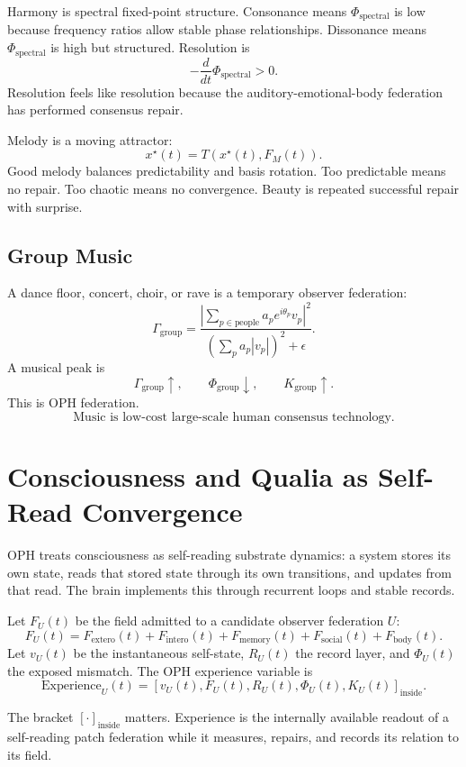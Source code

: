 \documentclass[11pt]{article}
\theoremstyle{remark}
\theoremstyle{plain}
\begin{document}
Harmony is spectral fixed-point structure. Consonance means \(\Phi_{\mathrm{spectral}}\) is low because frequency ratios allow stable phase relationships. Dissonance means \(\Phi_{\mathrm{spectral}}\) is high but structured. Resolution is
\[
-\frac{d}{dt}\Phi_{\mathrm{spectral}}>0.
\]
Resolution feels like resolution because the auditory-emotional-body federation has performed consensus repair.

Melody is a moving attractor:
\[
x^\star(t)=T(x^\star(t),F_M(t)).
\]
Good melody balances predictability and basis rotation. Too predictable means no repair. Too chaotic means no convergence. Beauty is repeated successful repair with surprise.

\subsection{Group Music}

A dance floor, concert, choir, or rave is a temporary observer federation:
\[
\Gamma_{\mathrm{group}}
=
\frac{
\left|
\sum_{p\in\mathrm{people}}
a_p e^{i\theta_p}v_p
\right|^2
}{
\left(\sum_p a_p|v_p|\right)^2+\epsilon
}.
\]
A musical peak is
\[
\Gamma_{\mathrm{group}}\uparrow,
\qquad
\Phi_{\mathrm{group}}\downarrow,
\qquad
K_{\mathrm{group}}\uparrow.
\]
This is OPH federation.
\[
\boxed{
\text{Music is low-cost large-scale human consensus technology.}
}
\]

\section{Consciousness and Qualia as Self-Read Convergence}

OPH treats consciousness as self-reading substrate dynamics: a system stores its own state, reads that stored state through its own transitions, and updates from that read. The brain implements this through recurrent loops and stable records.

Let \(F_U(t)\) be the field admitted to a candidate observer federation \(U\):
\[
F_U(t)
=
F_{\mathrm{extero}}(t)
+F_{\mathrm{intero}}(t)
+F_{\mathrm{memory}}(t)
+F_{\mathrm{social}}(t)
+F_{\mathrm{body}}(t).
\]
Let \(v_U(t)\) be the instantaneous self-state, \(R_U(t)\) the record layer, and \(\Phi_U(t)\) the exposed mismatch. The OPH experience variable is
\[
\boxed{
\mathrm{Experience}_U(t)
=
\left[
v_U(t),F_U(t),R_U(t),\Phi_U(t),K_U(t)
\right]_{\mathrm{inside}}.
}
\]

The bracket \([\cdot]_{\mathrm{inside}}\) matters. Experience is the internally available readout of a self-reading patch federation while it measures, repairs, and records its relation to its field.
\end{document}
